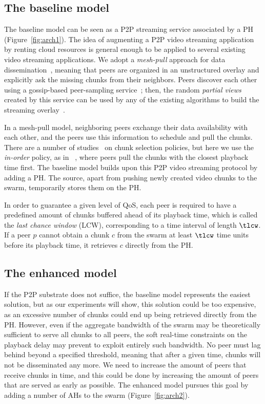 \subsection{The baseline model}
The baseline model can be seen as a P2P streaming service associated by a
PH (Figure~\ref{fig:arch1}). The idea of augmenting a P2P video streaming application by renting
cloud resources is general enough to be applied to several existing video
streaming applications. We adopt a {\em mesh-pull} approach for data
dissemination~\cite{challenge}, meaning that peers are organized in an
unstructured overlay and explicitly ask the missing chunks from their
neighbors. Peers discover each other using a gossip-based peer-sampling
service~\cite{croupier,gozar,cyclon}; then, the random \emph{partial
views} created by this service can be used by any of the existing algorithms
to build the streaming overlay~\cite{qoe,glive,newcoolstreaming,chainsaw}.

In a mesh-pull model, neighboring peers exchange their data availability
with each other, and the peers use this information to schedule and pull the
chunks. There are a number of studies~\cite{carlsson,chunkselection}
on chunk selection policies, but here we use the {\em in-order} policy, as in
\cool~\cite{coolstreaming}, where peers pull the chunks with the
closest playback time first. The baseline model builds upon this P2P video streaming protocol by adding a
PH. The source, apart from pushing newly created
video chunks to the swarm, temporarily stores them on the PH. 

In order to guarantee a
given level of QoS, each peer is required to have a predefined amount of
chunks buffered ahead of its playback time, which is called the \emph{last
chance window} (LCW), corresponding to a time interval of length $\tlcw$.
If a peer $p$ cannot obtain a chunk $c$ from the swarm at least $\tlcw$ time units before its playback time,
it retrieves $c$ directly from the PH.

\subsection{The enhanced model}

If the P2P substrate does not suffice, the baseline model represents the
easiest solution, but as our experiments will show, this solution could be too
expensive, as an excessive number of chunks could end up being retrieved
directly from the PH. However, even if the aggregate bandwidth of the swarm
may be theoretically sufficient to serve all chunks to all peers, the soft
real-time constraints on the playback delay may prevent to exploit entirely
such bandwidth. No peer must lag behind beyond a specified threshold, meaning
that after a given time, chunks will not be disseminated any more. We need to
increase the amount of peers that receive chunks in time, and this could be
done by increasing the amount of peers that are served as early as possible.
The enhanced model pursues this goal by adding a number of AHs to the swarm
(Figure~\ref{fig:arch2}).

